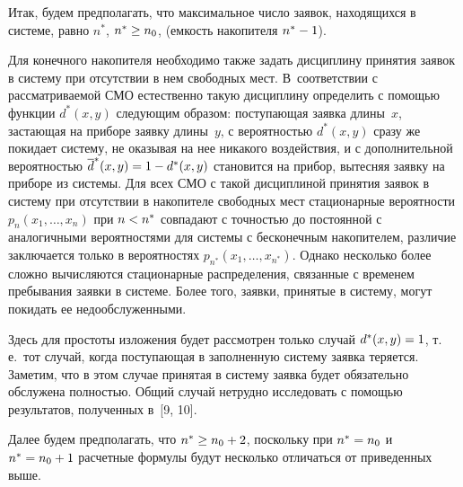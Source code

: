 \begin{multicols}{2}
Итак, будем предполагать, что максимальное число заявок,
находящихся в системе, равно $n^*$, $n^*\hm\ge n_0$,
(емкость накопителя $n^*\hm-1$).

Для конечного накопителя необходимо также задать
дисциплину принятия заявок в систему при отсутствии в нем
свободных мест.
В~соответствии с рассматриваемой СМО естественно такую
дисциплину определить с помощью функции $d^*(x,y)$
следующим образом: поступающая заявка длины~$x$,\linebreak
застающая на приборе заявку длины~$y$, с ве\-ро\-ят\-ностью
$d^*(x,y)$ сразу же покидает сис\-те\-му, не оказывая на нее
никакого воздействия, и с дополнительной вероятностью
$\d^*(x,y)\hm=1\hm-d^*(x,y)$ становит\-ся на прибор, вытесняя
заявку на приборе из сис\-те\-мы.
Для всех СМО с такой дисциплиной принятия заявок в сис\-те\-му
при отсутствии в накопителе свободных мест стационарные
вероятности $p_n(x_1,\ldots,x_n)$ при $n\hm<n^*$ совпадают
с точ\-ностью до постоянной с аналогичными вероятностями
для сис\-те\-мы с бесконечным накопителем, различие заключается
только в вероятностях $p_{n^*}(x_1,\ldots,x_{n^*})$.
Однако несколько более сложно вычисляются стационарные
распределения, связанные с временем пребывания заявки в
системе.
Более того, заявки, принятые в систему, могут покидать
ее недообслуженными.

Здесь для простоты изложения будет рассмотрен только
случай $d^*(x,y)\hm=1$, т.\,е.\ тот случай, когда поступающая
в заполненную систему заявка теряется.
Заметим, что в этом случае принятая в систему заявка
будет обязательно обслужена полностью.
Общий случай нетрудно исследовать с помощью результатов,
полученных в~[9, 10].

Далее будем предполагать, что $n^*\hm\ge n_0 \hm+ 2$, поскольку
при $n^*\hm=n_0$ и $n^*\hm=n_0 \hm+ 1$ расчетные формулы будут
несколько отличаться от приведенных выше.


\end{multicols}
